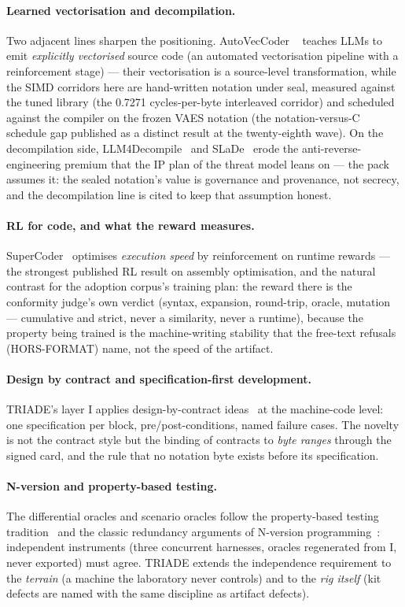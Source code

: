 \documentclass[10pt,a4paper]{article}
\begin{document}
\paragraph{Learned vectorisation and decompilation.}
Two adjacent lines sharpen the positioning. AutoVecCoder
~\cite{autoveccoder} teaches LLMs to emit \emph{explicitly vectorised}
source code (an automated vectorisation pipeline with a reinforcement
stage) --- their vectorisation is a source-level transformation, while
the SIMD corridors here are hand-written notation under seal, measured
against the tuned library (the 0.7271 cycles-per-byte interleaved
corridor) and scheduled against the compiler on the frozen VAES
notation (the notation-versus-C schedule gap published as a distinct
result at the twenty-eighth wave). On the decompilation side,
LLM4Decompile~\cite{llm4decompile} and SLaDe~\cite{slade} erode the
anti-reverse-engineering premium that the IP plan of the threat model
leans on --- the pack assumes it: the sealed notation's value is
governance and provenance, not secrecy, and the decompilation line is
cited to keep that assumption honest.

\paragraph{RL for code, and what the reward measures.}
SuperCoder~\cite{supercoder} optimises \emph{execution speed} by
reinforcement on runtime rewards --- the strongest published RL result
on assembly optimisation, and the natural contrast for the adoption
corpus's training plan: the reward there is the conformity judge's own
verdict (syntax, expansion, round-trip, oracle, mutation --- cumulative
and strict, never a similarity, never a runtime), because the property
being trained is the machine-writing stability that the free-text
refusals (HORS-FORMAT) name, not the speed of the artifact.

\paragraph{Design by contract and specification-first development.}
TRIADE's layer I applies design-by-contract ideas~\cite{meyer1992} at the
machine-code level: one specification per block, pre/post-conditions,
named failure cases. The novelty is not the contract style but the
binding of contracts to \emph{byte ranges} through the signed card, and
the rule that no notation byte exists before its specification.

\paragraph{N-version and property-based testing.} The differential
oracles and scenario oracles follow the property-based testing
tradition~\cite{claessen2000} and the classic redundancy arguments of
N-version programming~\cite{avizienis1985}: independent instruments (three
concurrent harnesses, oracles regenerated from I, never exported) must
agree. TRIADE extends the independence requirement to the \emph{terrain}
(a machine the laboratory never controls) and to the \emph{rig itself}
(kit defects are named with the same discipline as artifact defects).
\end{document}
